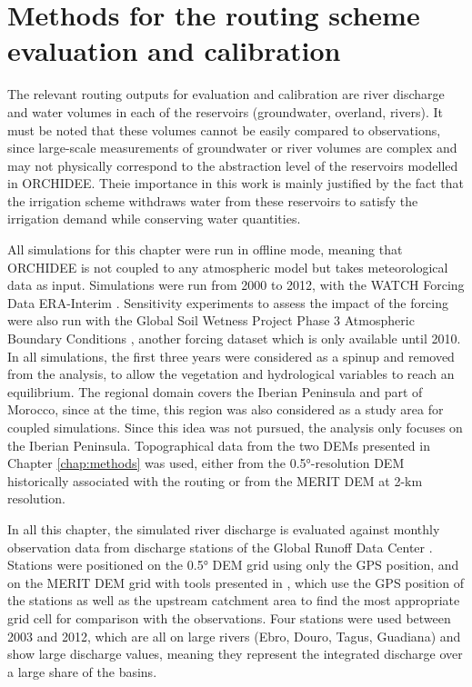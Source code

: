 \section{Methods for the routing scheme evaluation and calibration}

The relevant routing outputs for evaluation and calibration are river discharge and water volumes in each of the reservoirs (groundwater, overland, rivers). 
It must be noted that these volumes cannot be easily compared to observations, since large-scale measurements of groundwater or river volumes are complex and may not physically correspond to the abstraction level of the reservoirs modelled in ORCHIDEE.
Theie importance in this work is mainly justified by the fact that the irrigation scheme withdraws water from these reservoirs to satisfy the irrigation demand while conserving water quantities.

All simulations for this chapter were run in offline mode, meaning that ORCHIDEE is not coupled to any atmospheric model but takes meteorological data as input. 
Simulations were run from 2000 to 2012, with the WATCH Forcing Data ERA-Interim \citep[WFDEI, ][]{weedon_wfdei_2014}. Sensitivity experiments to assess the impact of the forcing were also run with the Global Soil Wetness Project Phase 3 Atmospheric Boundary Conditions \citep[GSWP3, ][]{kim_hyungjun_global_2017}, another forcing dataset which is only available until 2010.
In all simulations, the first three years were considered as a spinup and removed from the analysis, to allow the vegetation and hydrological variables to reach an equilibrium. The regional domain covers the Iberian Peninsula and part of Morocco, since at the time, this region was also considered as a study area for coupled simulations. Since this idea was not pursued, the analysis only focuses on the Iberian Peninsula.
Topographical data from the two DEMs presented in Chapter \ref{chap:methods} was used, either from the 0.5°-resolution DEM historically associated with the \std routing or from the MERIT DEM at 2-km resolution.

In all this chapter, the simulated river discharge is evaluated against monthly observation data from discharge stations of the Global Runoff Data Center \cite[GRDC, https://grdc.bafg.de,][]{fekete_global_2003}.
Stations were positioned on the 0.5° DEM grid using only the GPS position, and on the MERIT DEM grid with tools presented in \cite{polcher_hydrological_2023}, which use the GPS position of the stations as well as the upstream catchment area to find the most appropriate grid cell for comparison with the observations. 
Four stations were used between 2003 and 2012, which are all on large rivers (Ebro, Douro, Tagus, Guadiana) and show large discharge values, meaning they represent the integrated discharge over a large share of the basins.

